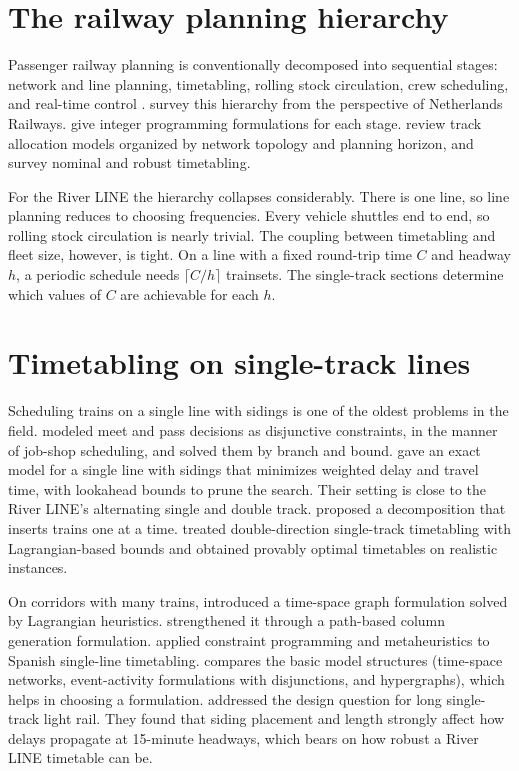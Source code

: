 \documentclass[11pt]{article}
\begin{document}
\section{The railway planning hierarchy}

Passenger railway planning is conventionally decomposed into sequential stages: network and line planning, timetabling, rolling stock circulation, crew scheduling, and real-time control \citep{huisman2005operations,caprara2007passenger}. \citet{huisman2005operations} survey this hierarchy from the perspective of Netherlands Railways. \citet{caprara2007passenger} give integer programming formulations for each stage. \citet{lusby2011railway} review track allocation models organized by network topology and planning horizon, and \citet{cacchiani2012nominal} survey nominal and robust timetabling.

For the River LINE the hierarchy collapses considerably. There is one line, so line planning reduces to choosing frequencies. Every vehicle shuttles end to end, so rolling stock circulation is nearly trivial. The coupling between timetabling and fleet size, however, is tight. On a line with a fixed round-trip time $C$ and headway $h$, a periodic schedule needs $\lceil C/h \rceil$ trainsets. The single-track sections determine which values of $C$ are achievable for each $h$.

\section{Timetabling on single-track lines}

Scheduling trains on a single line with sidings is one of the oldest problems in the field. \citet{szpigel1973optimal} modeled meet and pass decisions as disjunctive constraints, in the manner of job-shop scheduling, and solved them by branch and bound. \citet{higgins1996optimal} gave an exact model for a single line with sidings that minimizes weighted delay and travel time, with lookahead bounds to prune the search. Their setting is close to the River LINE's alternating single and double track. \citet{carey1995model} proposed a decomposition that inserts trains one at a time. \citet{zhou2007single} treated double-direction single-track timetabling with Lagrangian-based bounds and obtained provably optimal timetables on realistic instances.

On corridors with many trains, \citet{caprara2002modeling} introduced a time-space graph formulation solved by Lagrangian heuristics. \citet{cacchiani2008column} strengthened it through a path-based column generation formulation. \citet{barber2009metaheuristic} applied constraint programming and metaheuristics to Spanish single-line timetabling. \citet{harrod2012tutorial} compares the basic model structures (time-space networks, event-activity formulations with disjunctions, and hypergraphs), which helps in choosing a formulation. \citet{dure1999maximizing} addressed the design question for long single-track light rail. They found that siding placement and length strongly affect how delays propagate at 15-minute headways, which bears on how robust a River LINE timetable can be.
\end{document}
